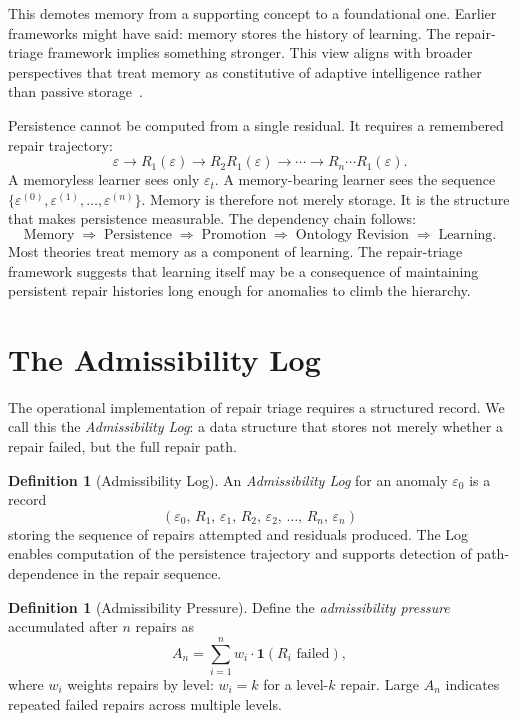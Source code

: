 \documentclass[12pt,oneside]{book}
\theoremstyle{plain}
\theoremstyle{definition}
\newtheorem{definition}[theorem]{Definition}
\theoremstyle{remark}
\newcommand{\eps}{\varepsilon}
\newcommand{\1}{\mathbf{1}}
\begin{document}
This demotes memory from a supporting concept to a foundational one. Earlier frameworks might have said: memory stores the history of learning. The repair-triage framework implies something stronger. This view aligns with broader perspectives that treat memory as constitutive of adaptive intelligence rather than passive storage~\cite{holland1992,friston2010}.

\begin{derivbox}[frametitle={Derivation 6: Memory as the Condition for Persistence}]
Persistence cannot be computed from a single residual. It requires a remembered repair trajectory:
\[
\eps \to R_1(\eps) \to R_2 R_1(\eps) \to \cdots \to R_n \cdots R_1(\eps).
\]
A memoryless learner sees only $\eps_t$. A memory-bearing learner sees the sequence $\{\eps^{(0)}, \eps^{(1)}, \ldots, \eps^{(n)}\}$. Memory is therefore not merely storage. It is the structure that makes persistence measurable. The dependency chain follows:
\[
\text{Memory} \;\Rightarrow\; \text{Persistence} \;\Rightarrow\; \text{Promotion} \;\Rightarrow\; \text{Ontology Revision} \;\Rightarrow\; \text{Learning.}
\]
Most theories treat memory as a component of learning. The repair-triage framework suggests that learning itself may be a consequence of maintaining persistent repair histories long enough for anomalies to climb the hierarchy.
\end{derivbox}

\section{The Admissibility Log}

The operational implementation of repair triage requires a structured record. We call this the \emph{Admissibility Log}: a data structure that stores not merely whether a repair failed, but the full repair path.

\begin{definition}[Admissibility Log]
An \emph{Admissibility Log} for an anomaly $\eps_0$ is a record
\[
(\eps_0,\, R_1,\, \eps_1,\, R_2,\, \eps_2,\, \ldots,\, R_n,\, \eps_n)
\]
storing the sequence of repairs attempted and residuals produced. The Log enables computation of the persistence trajectory and supports detection of path-dependence in the repair sequence.
\end{definition}

\begin{definition}[Admissibility Pressure]
Define the \emph{admissibility pressure} accumulated after $n$ repairs as
\[
A_n = \sum_{i=1}^{n} w_i \cdot \mathbf{1}(R_i \text{ failed}),
\]
where $w_i$ weights repairs by level: $w_i = k$ for a level-$k$ repair. Large $A_n$ indicates repeated failed repairs across multiple levels.
\end{definition}
\end{document}
